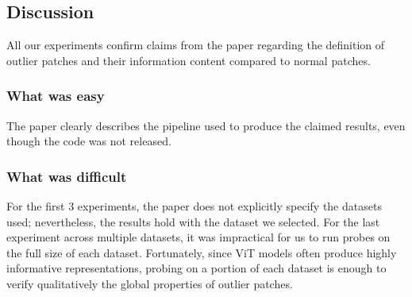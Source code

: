 \subsection{Discussion}

All our experiments confirm claims from the paper regarding the definition of outlier patches and their information content compared to normal patches. 

\subsubsection{What was easy}
The paper clearly describes the pipeline used to produce the claimed results, even though the code was not released.

\subsubsection{What was difficult}
For the first 3 experiments, the paper does not explicitly specify the datasets used; nevertheless, the results hold with the dataset we selected. For the last experiment across multiple datasets, it was impractical for us to run probes on the full size of each dataset. Fortunately, since ViT models often produce highly informative representations, probing on a portion of each dataset is enough to verify qualitatively the global properties of outlier patches.  
